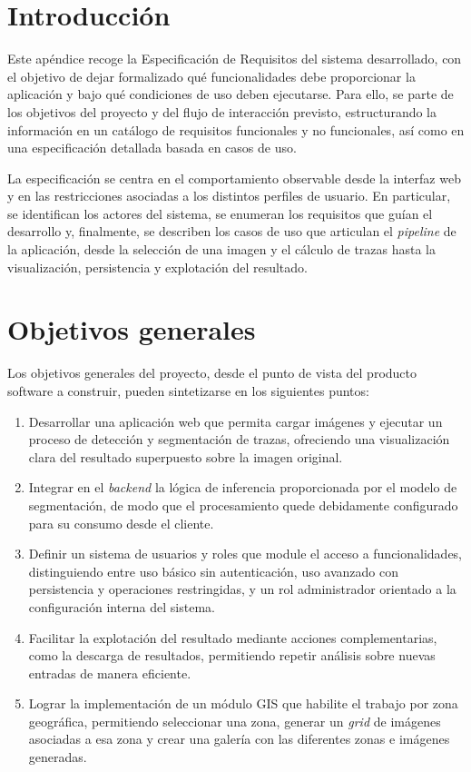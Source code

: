 
\section{Introducción}
Este apéndice recoge la Especificación de Requisitos del sistema desarrollado, con el objetivo de dejar formalizado qué funcionalidades debe proporcionar la aplicación y bajo qué condiciones de uso deben ejecutarse. Para ello, se parte de los objetivos del proyecto y del flujo de interacción previsto, estructurando la información en un catálogo de requisitos funcionales y no funcionales, así como en una especificación detallada basada en casos de uso.

La especificación se centra en el comportamiento observable desde la interfaz web y en las restricciones asociadas a los distintos perfiles de usuario. En particular, se identifican los actores del sistema, se enumeran los requisitos que guían el desarrollo y, finalmente, se describen los casos de uso que articulan el \textit{pipeline} de la aplicación, desde la selección de una imagen y el cálculo de trazas hasta la visualización, persistencia y explotación del resultado.

\section{Objetivos generales}
Los objetivos generales del proyecto, desde el punto de vista del producto software a construir, pueden sintetizarse en los siguientes puntos:
\begin{enumerate}
	\item Desarrollar una aplicación web que permita cargar imágenes y ejecutar un proceso de detección y segmentación de trazas, ofreciendo una visualización clara del resultado superpuesto sobre la imagen original.
	\item Integrar en el \textit{backend} la lógica de inferencia proporcionada por el modelo de segmentación, de modo que el procesamiento quede debidamente configurado para su consumo desde el cliente.
	\item Definir un sistema de usuarios y roles que module el acceso a funcionalidades, distinguiendo entre uso básico sin autenticación, uso avanzado con persistencia y operaciones restringidas, y un rol administrador orientado a la configuración interna del sistema.
	\item Facilitar la explotación del resultado mediante acciones complementarias, como la descarga de resultados, permitiendo repetir análisis sobre nuevas entradas de manera eficiente.
	\item Lograr la implementación de un módulo GIS que habilite el trabajo por zona geográfica, permitiendo seleccionar una zona, generar un \textit{grid} de imágenes asociadas a esa zona y crear una galería con las diferentes zonas e imágenes generadas.
\end{enumerate}


